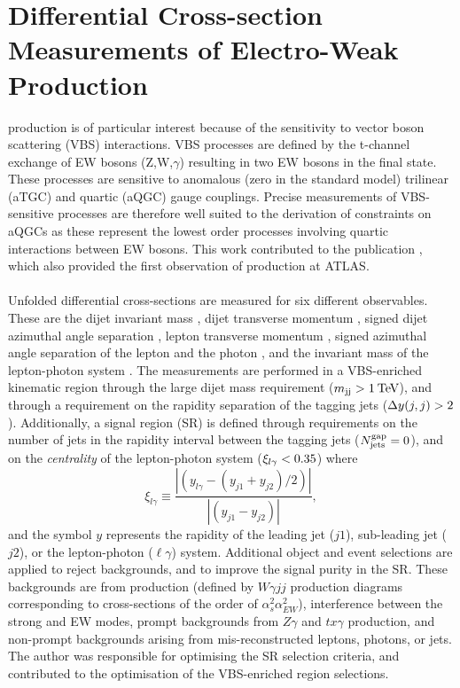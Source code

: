 \documentclass{thesissummary}
\begin{document}
\section{Differential Cross-section Measurements of Electro-Weak \wyjj Production}

\Ewwy production is of particular interest because of the sensitivity to vector boson scattering (VBS) interactions. VBS processes are defined by the t-channel exchange of EW bosons (Z,W,$\gamma$) resulting in two EW bosons in the final state. These processes are sensitive to anomalous (zero in the standard model) trilinear (aTGC) and quartic (aQGC) gauge couplings. Precise measurements of VBS-sensitive processes are therefore well suited to the derivation of constraints on aQGCs as these represent the lowest order processes involving quartic interactions between EW bosons. This work contributed to the publication \cite{vbswy}, which also provided the first observation of \ewwy production at ATLAS. 
\\\\
%
Unfolded differential cross-sections are measured for six different observables. These are the dijet invariant mass \mjj, dijet transverse momentum \ptjj, signed dijet azimuthal angle separation \jjdphi, lepton transverse momentum \ptlep, signed azimuthal angle separation of the lepton and the photon \lepgamdphi, and the invariant mass of the lepton-photon system \mly. The measurements are performed in a VBS-enriched kinematic region through the large dijet mass requirement ($m_{\text{jj}}>1\hspace{2pt}\text{Te\kern -0.1em V}$), and through a requirement on the rapidity separation of the tagging jets ($\Delta y(j,j)>2$). 
Additionally, a signal region (SR) is defined through requirements on the number of jets in the rapidity interval between the tagging jets ($N^{\text{gap}}_{\text{jets}}=0$), and on the \textit{centrality} of the lepton-photon system ($\xi_{l\gamma}<0.35$)
where 
\begin{equation} 
    \xi_{l\gamma}\equiv\frac{|(y_{l\gamma}-(y_{j1}+y_{j2})/2)|}{|(y_{j1}-y_{j2})|},
\end{equation}
and the symbol $y$ represents the rapidity of the leading jet ($j1$), sub-leading jet ($j2$), or the lepton-photon ($\ell\gamma$) system.
Additional object and event selections are applied to reject backgrounds, and to improve the signal purity in the SR. These backgrounds are from \qcdwy production (defined by $W\gamma jj$ production diagrams corresponding to cross-sections of the order of $\alpha_s^2\alpha_{EW}^2$), interference between the strong and EW \wyjj modes, prompt backgrounds from $Z\gamma$ and $tx\gamma$ production, and non-prompt backgrounds arising from mis-reconstructed leptons, photons, or jets. The author was responsible for optimising the SR selection criteria, and contributed to the optimisation of the VBS-enriched region selections.
\end{document}

